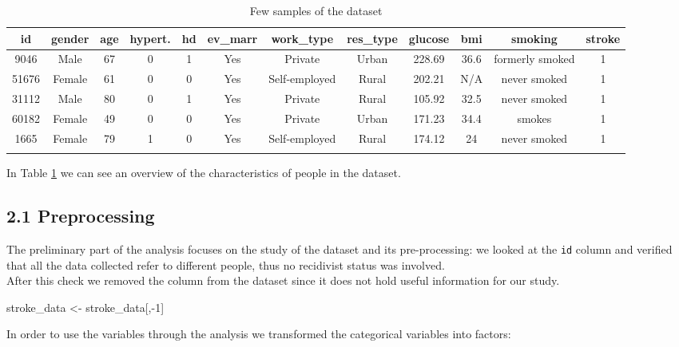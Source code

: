 \documentclass[
]{article}
\newenvironment{Shaded}{\begin{snugshade}}{\end{snugshade}}
\newcommand{\DecValTok}[1]{\textcolor[rgb]{0.00,0.00,0.81}{#1}}
\newcommand{\NormalTok}[1]{#1}
\newcommand{\OtherTok}[1]{\textcolor[rgb]{0.56,0.35,0.01}{#1}}
\newcommand{\SpecialCharTok}[1]{\textcolor[rgb]{0.00,0.00,0.00}{#1}}
\begin{document}
\begin{longtable}[]{@{}cccccccccccc@{}}
\toprule
id & gender & age & hypert. & hd & ev\_marr & work\_type & res\_type &
glucose & bmi & smoking & stroke \\
\midrule
\endhead
9046 & Male & 67 & 0 & 1 & Yes & Private & Urban & 228.69 & 36.6 &
formerly smoked & 1 \\
51676 & Female & 61 & 0 & 0 & Yes & Self-employed & Rural & 202.21 & N/A
& never smoked & 1 \\
31112 & Male & 80 & 0 & 1 & Yes & Private & Rural & 105.92 & 32.5 &
never smoked & 1 \\
60182 & Female & 49 & 0 & 0 & Yes & Private & Urban & 171.23 & 34.4 &
smokes & 1 \\
1665 & Female & 79 & 1 & 0 & Yes & Self-employed & Rural & 174.12 & 24 &
never smoked & 1 \\
\bottomrule
\caption{Few samples of the dataset}\label{samples_of_dataset}
\end{longtable}

In Table \ref{samples_of_dataset} we can see an overview of the characteristics of people in the dataset.

\hypertarget{preprocessing}{%
\subsection{2.1 Preprocessing}\label{preprocessing}}

The preliminary part of the analysis focuses on the study of the dataset
and its pre-processing: we looked at the \texttt{id} column and verified
that all the data collected refer to different people, thus no
recidivist status was involved.\\
After this check we removed the column from the dataset since it does not
hold useful information for our study.

\begin{Shaded}
\begin{Highlighting}[]
\NormalTok{stroke\_data }\OtherTok{\textless{}{-}}\NormalTok{ stroke\_data[,}\SpecialCharTok{{-}}\DecValTok{1}\NormalTok{]}
\end{Highlighting}
\end{Shaded}

In order to use the variables through the analysis we transformed the
categorical variables into factors:
\end{document}

